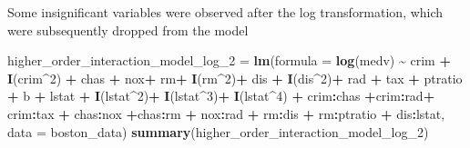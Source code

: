 \documentclass[
]{article}
\newenvironment{Shaded}{\begin{snugshade}}{\end{snugshade}}
\newcommand{\AttributeTok}[1]{\textcolor[rgb]{0.13,0.29,0.53}{#1}}
\newcommand{\DecValTok}[1]{\textcolor[rgb]{0.00,0.00,0.81}{#1}}
\newcommand{\FunctionTok}[1]{\textcolor[rgb]{0.13,0.29,0.53}{\textbf{#1}}}
\newcommand{\NormalTok}[1]{#1}
\newcommand{\OtherTok}[1]{\textcolor[rgb]{0.56,0.35,0.01}{#1}}
\newcommand{\SpecialCharTok}[1]{\textcolor[rgb]{0.81,0.36,0.00}{\textbf{#1}}}
\begin{document}
Some insignificant variables were observed after the log transformation,
which were subsequently dropped from the model

\begin{Shaded}
\begin{Highlighting}[]
\NormalTok{higher\_order\_interaction\_model\_log\_2 }\OtherTok{=} \FunctionTok{lm}\NormalTok{(}\AttributeTok{formula =} \FunctionTok{log}\NormalTok{(medv) }\SpecialCharTok{\textasciitilde{}}\NormalTok{ crim }\SpecialCharTok{+} \FunctionTok{I}\NormalTok{(crim}\SpecialCharTok{\^{}}\DecValTok{2}\NormalTok{) }\SpecialCharTok{+}\NormalTok{ chas }\SpecialCharTok{+}\NormalTok{ nox}\SpecialCharTok{+}\NormalTok{ rm}\SpecialCharTok{+} \FunctionTok{I}\NormalTok{(rm}\SpecialCharTok{\^{}}\DecValTok{2}\NormalTok{)}\SpecialCharTok{+}\NormalTok{ dis }\SpecialCharTok{+} \FunctionTok{I}\NormalTok{(dis}\SpecialCharTok{\^{}}\DecValTok{2}\NormalTok{)}\SpecialCharTok{+}\NormalTok{ rad }\SpecialCharTok{+}\NormalTok{ tax }\SpecialCharTok{+}\NormalTok{ ptratio }\SpecialCharTok{+}\NormalTok{ b }\SpecialCharTok{+}\NormalTok{ lstat }\SpecialCharTok{+} \FunctionTok{I}\NormalTok{(lstat}\SpecialCharTok{\^{}}\DecValTok{2}\NormalTok{)}\SpecialCharTok{+} \FunctionTok{I}\NormalTok{(lstat}\SpecialCharTok{\^{}}\DecValTok{3}\NormalTok{)}\SpecialCharTok{+} \FunctionTok{I}\NormalTok{(lstat}\SpecialCharTok{\^{}}\DecValTok{4}\NormalTok{) }\SpecialCharTok{+}\NormalTok{ crim}\SpecialCharTok{:}\NormalTok{chas  }\SpecialCharTok{+}\NormalTok{crim}\SpecialCharTok{:}\NormalTok{rad}\SpecialCharTok{+}\NormalTok{ crim}\SpecialCharTok{:}\NormalTok{tax }\SpecialCharTok{+}\NormalTok{ chas}\SpecialCharTok{:}\NormalTok{nox }\SpecialCharTok{+}\NormalTok{chas}\SpecialCharTok{:}\NormalTok{rm }\SpecialCharTok{+}\NormalTok{ nox}\SpecialCharTok{:}\NormalTok{rad }\SpecialCharTok{+}\NormalTok{ rm}\SpecialCharTok{:}\NormalTok{dis }\SpecialCharTok{+}\NormalTok{ rm}\SpecialCharTok{:}\NormalTok{ptratio }\SpecialCharTok{+}\NormalTok{ dis}\SpecialCharTok{:}\NormalTok{lstat, }\AttributeTok{data =}\NormalTok{ boston\_data)}
\FunctionTok{summary}\NormalTok{(higher\_order\_interaction\_model\_log\_2)}
\end{Highlighting}
\end{Shaded}
\end{document}
